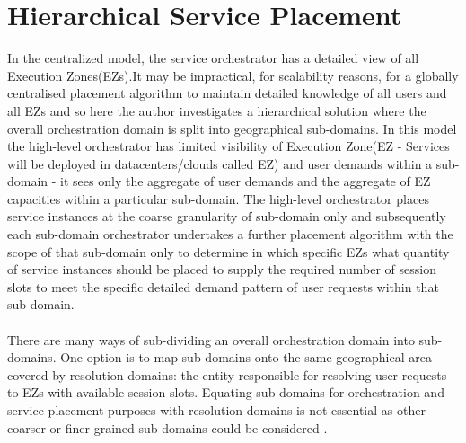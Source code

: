 \section{Hierarchical Service Placement}
In the centralized model, the service orchestrator has a detailed view of all Execution Zones(EZs).It may be impractical, for scalability reasons, for a globally centralised placement algorithm to maintain detailed knowledge of all users and all EZs and so here the author investigates a hierarchical solution where the overall orchestration domain is split into geographical sub-domains.
In this model the high-level orchestrator has limited visibility of Execution Zone(EZ - Services will be deployed in datacenters/clouds called EZ) and user demands within a sub-domain - it sees only the aggregate of user demands and the aggregate of EZ capacities within a particular sub-domain. The high-level orchestrator places service instances at the coarse granularity of sub-domain only and subsequently each sub-domain orchestrator undertakes a further placement algorithm with the scope of that sub-domain only to determine in which specific EZs what quantity of service instances should be placed to supply the required number of session slots to meet the specific detailed demand pattern of user requests within that sub-domain.
\paragraph{}There are many ways of sub-dividing an overall orchestration domain into sub-domains. One option is to map sub-domains onto the same geographical area covered by resolution domains: the entity responsible for resolving user requests to EZs with available session slots. Equating sub-domains for orchestration and service placement purposes with resolution domains is not essential as other coarser or finer grained sub-domains could be considered
 \cite{maini_hierarchical_2016}.
